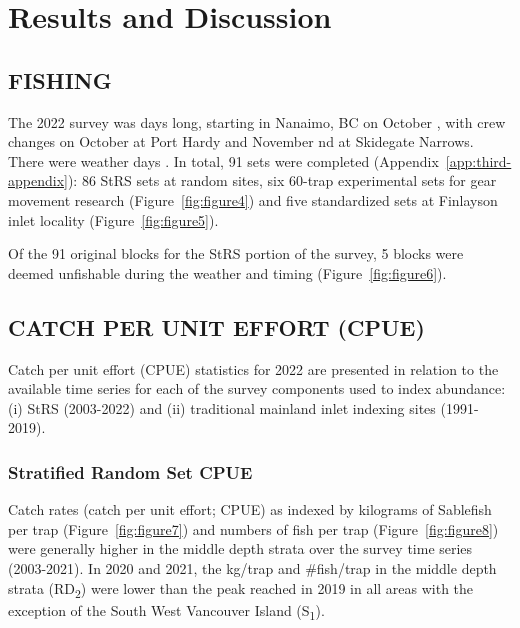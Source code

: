 \documentclass[12pt]{article}\usepackage[]{graphicx}\usepackage[]{color}
\begin{document}
\hypertarget{results-and-discussion}{%
\section{Results and Discussion}\label{results-and-discussion}}

\hypertarget{fishing}{%
\subsection{FISHING}\label{fishing}}

The 2022 survey was days long, starting in Nanaimo, BC on October , with crew changes on October at Port Hardy and November nd at Skidegate Narrows. There were weather days . In total, 91 sets were completed (Appendix~\ref{app:third-appendix}): 86 StRS sets at random sites, six 60-trap experimental sets for gear movement research (Figure~\ref{fig:figure4}) and five standardized sets at Finlayson inlet locality (Figure~\ref{fig:figure5}).

Of the 91 original blocks for the StRS portion of the survey, 5 blocks were deemed unfishable during the weather and timing (Figure~\ref{fig:figure6}).

\hypertarget{catch-per-unit-effort-cpue}{%
\subsection{CATCH PER UNIT EFFORT (CPUE)}\label{catch-per-unit-effort-cpue}}

Catch per unit effort (CPUE) statistics for 2022 are presented in relation to the available time series for each of the survey components used to index abundance: (i) StRS (2003-2022) and (ii) traditional mainland inlet indexing sites (1991-2019).

\hypertarget{stratified-random-set-cpue}{%
\subsubsection{Stratified Random Set CPUE}\label{stratified-random-set-cpue}}

Catch rates (catch per unit effort; CPUE) as indexed by kilograms of Sablefish per trap (Figure~\ref{fig:figure7}) and numbers of fish per trap (Figure~\ref{fig:figure8}) were generally higher in the middle depth strata over the survey time series (2003-2021). In 2020 and 2021, the kg/trap and \#fish/trap in the middle depth strata (RD\textsubscript{2}) were lower than the peak reached in 2019 in all areas with the exception of the South West Vancouver Island (S\textsubscript{1}).
\end{document}

